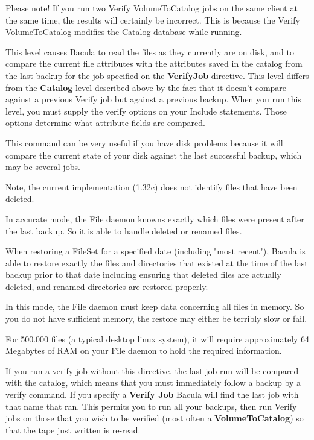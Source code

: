\begin{description}
\begin{description}
   Please note!  If you run two Verify VolumeToCatalog jobs on the same
   client at the same time, the results will certainly be incorrect.  This
   is because the Verify VolumeToCatalog modifies the Catalog database
   while running.

\item [DiskToCatalog]
   This level causes Bacula to read the files as they currently are on
   disk, and to compare the current file attributes with the attributes
   saved in the catalog from the last backup for the job specified on the
   {\bf VerifyJob} directive.  This level differs from the {\bf Catalog}
   level described above by the fact that it doesn't compare against a
   previous Verify job but against a previous backup.  When you run this
   level, you must supply the verify options on your Include statements.
   Those options determine what attribute fields are compared.

   This command can be very useful if you have disk problems because it
   will compare the current state of your disk against the last successful
   backup, which may be several jobs.

   Note, the current implementation (1.32c) does not identify files that
   have been deleted.
\end{description}

\item [Accurate = \lt{}yes\vb{}no\gt{}]
   In accurate mode, the File daemon knowns exactly which files were present
   after the last backup. So it is able to handle deleted or renamed files.

   When restoring a FileSet for a specified date (including "most
   recent"), Bacula is able to restore exactly the files and
   directories that existed at the time of the last backup prior to
   that date including ensuring that deleted files are actually deleted,
   and renamed directories are restored properly.

   In this mode, the File daemon must keep data concerning all files in
   memory.  So you do not have sufficient memory, the restore may
   either be terribly slow or fail.


   For 500.000 files (a typical desktop linux system), it will require
   approximately 64 Megabytes of RAM on your File daemon to hold the
   required information.

\item [Verify Job = \lt{}Job-Resource-Name\gt{}]
   If you run a verify job without this directive, the last job run will be
   compared with the catalog, which means that you must immediately follow
   a backup by a verify command.  If you specify a {\bf Verify Job} Bacula
   will find the last job with that name that ran.  This permits you to run
   all your backups, then run Verify jobs on those that you wish to be
   verified (most often a {\bf VolumeToCatalog}) so that the tape just
   written is re-read.


\end{description}
